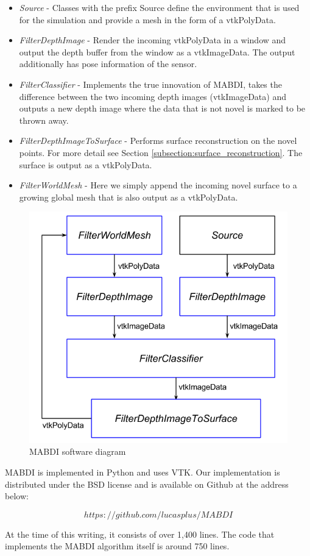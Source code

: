 \begin{sloppypar}
\begin{itemize}
    \item  \textit{Source} - Classes with the prefix Source define the
    environment that is used for the simulation and provide a mesh in the form
    of a vtkPolyData.
    \item \textit{FilterDepthImage} - Render the incoming vtkPolyData in a
    window and output the depth buffer from the window as a vtkImageData. The
    output additionally has pose information of the sensor.
    \item \textit{FilterClassifier} - Implements the true innovation of MABDI,
    takes the difference between the two incoming depth images (vtkImageData)
    and outputs a new depth image where the data that is not novel is marked to
    be thrown away.
    \item \textit{FilterDepthImageToSurface} - Performs surface reconstruction
    on the novel points. For more detail see Section
    \ref{subsection:surface_reconstruction}. The surface is output as a
    vtkPolyData.
    \item \textit{FilterWorldMesh} - Here we simply append the incoming novel
    surface to a growing global mesh that is also output as a vtkPolyData.
\end{itemize}
\end{sloppypar}

\begin{figure}[h]%
\centering
\includegraphics[width=.75\textwidth]{figures/diagram_software.png}
\caption{MABDI software diagram}
\label{fig:software}
\end{figure}

MABDI is implemented in Python and uses VTK. Our implementation is distributed
under the BSD license and is available on Github at the address below:

$$
https://github.com/lucasplus/MABDI
$$

At the time of this writing, it consists of over 1,400 lines. The code that
implements the MABDI algorithm itself is around 750 lines.
